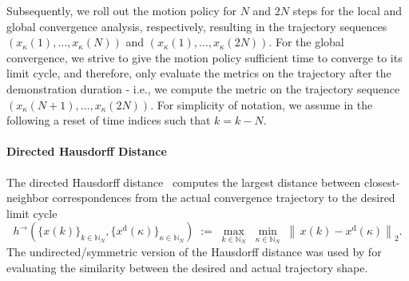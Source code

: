 Subsequently, we roll out the motion policy for $N$ and $2N$ steps for the local and global convergence analysis, respectively, resulting in the trajectory sequences $(x_\kappa(1), \dots, x_\kappa(N))$ and $(x_\kappa(1), \dots, x_\kappa(2N))$. For the global convergence, we strive to give the motion policy sufficient time to converge to its limit cycle, and therefore, only evaluate the metrics on the trajectory after the demonstration duration - i.e., we compute the metric on the trajectory sequence $(x_\kappa(N+1), \dots, x_\kappa(2N))$. For simplicity of notation, we assume in the following a reset of time indices such that $k = k-N$.

\paragraph{Directed Hausdorff Distance}
The directed Hausdorff distance~\citep{hausdorff1914grundzuge, huttenlocher1993comparing} computes the largest distance between closest-neighbor correspondences from the actual convergence trajectory to the desired limit cycle
\begin{equation}
    h^{\rightarrow}\! \left (\{x(k)\}_{k \in\mathbb{N}_N},\{x^{\mathrm d}(\kappa)\}_{\kappa\in\mathbb{N}_N} \right ) \;:=\; \max_{k\in\mathbb{N}_N}\; \min_{\kappa\in\mathbb{N}_N} \; \left \lVert \,x(k)-x^{\mathrm d}(\kappa) \right \rVert_2.
\end{equation}
The undirected/symmetric version of the Hausdorff distance was used by \citet{zhi2024teaching} for evaluating the similarity between the desired and actual trajectory shape.


